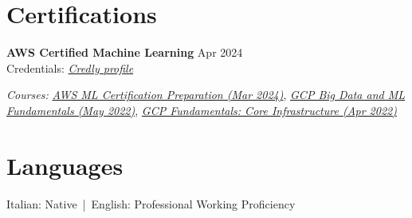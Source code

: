 \documentclass[11pt,a4paper]{article}
\let\OldHref\href
\renewcommand{\href}[2]{\OldHref{#1}{\textit{#2}}}
\begin{document}
	\section*{Certifications}
	{\small
		\textbf{AWS Certified Machine Learning} \hfill Apr 2024 \\
		Credentials: \href{https://www.credly.com/badges/ab41e8bd-32a3-49ce-a7a5-e3106f58beab/public_url}{Credly profile}
		
		\textit{Courses: }%
		\href{https://certificates.cloudacademy.com/8997053f1d2091596d528402607d41ca312060fc.pdf}{AWS ML Certification Preparation (Mar 2024)}, %
		\href{https://www.coursera.org/account/accomplishments/verify/KFC43YVQX5ZS}{GCP Big Data and ML Fundamentals (May 2022)}, %
		\href{https://www.coursera.org/account/accomplishments/verify/GCCEPUHES7UC}{GCP Fundamentals: Core Infrastructure (Apr 2022)}
	}
	
	\section*{Languages}
	Italian: Native \,|\, English: Professional Working Proficiency
	
\end{document}
